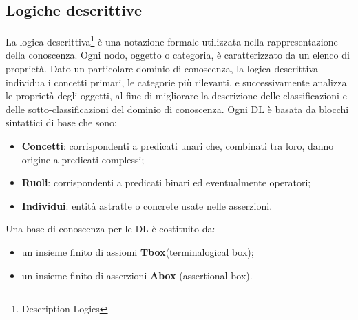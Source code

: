 \documentclass[a4paper,11pt]{article}
\begin{document}
\newpage

\subsection{Logiche descrittive}
\label{sec:2.3}

La logica descrittiva\footnote{Description Logics} è una notazione formale utilizzata nella rappresentazione della conoscenza. Ogni nodo, oggetto o categoria, è caratterizzato da un elenco di proprietà.
Dato un particolare dominio di conoscenza, la logica descrittiva individua i concetti primari, le categorie più rilevanti, e successivamente analizza le proprietà degli oggetti, al fine di migliorare la descrizione delle classificazioni e delle sotto-classificazioni del dominio di conoscenza. Ogni DL è basata da blocchi sintattici di base che sono:
\begin{itemize}
\item \textbf{Concetti}: corrispondenti a predicati unari che, combinati tra loro, danno origine a predicati complessi; 
\item \textbf{Ruoli}: corrispondenti a predicati binari ed eventualmente operatori;
\item \textbf{Individui}: entità astratte o concrete usate nelle asserzioni.
\end{itemize}
Una base di conoscenza per le DL è costituito da:
\begin{itemize}
\item un insieme finito di assiomi \textbf{Tbox}(terminalogical box);
\item un insieme finito di asserzioni \textbf{Abox} (assertional box).
\end{itemize}
\end{document}
